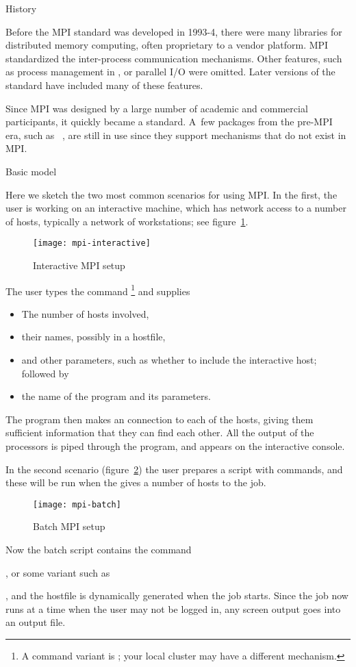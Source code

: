  {History}

Before the MPI standard was developed in 1993-4, there were many
libraries for distributed memory computing, often proprietary
to a vendor platform. MPI standardized the inter-process communication
mechanisms. Other features, such as process management in ,
or parallel I/O were omitted. Later versions of the standard
have included many of these features.

Since MPI was designed by a large number of academic and commercial
participants, it quickly became a standard. A~few packages
from the pre-MPI era, such as ~\cite{charmpp},
are still in use since they support mechanisms that do not exist
in MPI.

 {Basic model}
\label{sec:mpiexec}

Here we sketch the two most common scenarios for using MPI. In the
first, the user is working on an interactive machine, which has
network access to a number of hosts, typically a network of workstations;
see figure~\ref{fig:mpi-interactive}.
\begin{figure}[ht]
  \texttt{[image: mpi-interactive]}
  \caption{Interactive MPI setup}
  \label{fig:mpi-interactive}
\end{figure}
The user types the command \footnote
{A command variant is ; your local cluster
  may have a different mechanism.}
and supplies
\begin{itemize}
\item The number of hosts involved,
\item their names, possibly in a hostfile,
\item and other parameters, such as whether to include the interactive
  host; followed by
\item the name of the program and its parameters.
\end{itemize}
The  program then makes an  connection
to each of the hosts, giving them sufficient information that they 
can find each other. All the output of the processors is piped through the 
 program, and appears on the interactive console.

In the second scenario (figure~\ref{fig:mpi-batch}) the user prepares
a  script with commands, and these will be
run when the  gives a number of hosts
to the job.
\begin{figure}[ht]
  \texttt{[image: mpi-batch]}
  \caption{Batch MPI setup}
  \label{fig:mpi-batch}
\end{figure}
Now the batch script contains the  command%
\begin{istc}
, or some variant such as %
\end{istc}
, and the hostfile is dynamically generated when the job starts.
Since the job now runs at a time when the user may not be logged in, 
any screen output goes into an output file.


